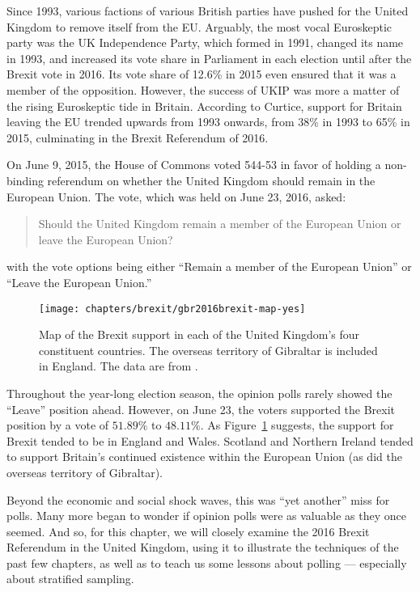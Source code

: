 Since 1993, various factions of various British parties have pushed for the United Kingdom to remove itself from the EU. Arguably, the most vocal Euroskeptic party was the UK Independence Party, which formed in 1991, changed its name in 1993, and increased its vote share in Parliament in each election until after the Brexit vote in 2016. Its vote share of 12.6\% in 2015 even ensured that it was a member of the opposition. However, the success of UKIP was more a matter of the rising Euroskeptic tide in Britain. According to Curtice, support for Britain leaving the EU trended upwards from 1993 onwards, from 38\% in 1993 to 65\% in 2015, culminating in the Brexit Referendum of 2016.\cite{tarran-2016} 


On June 9, 2015, the House of Commons voted 544-53 in favor of holding a non-binding referendum on whether the United Kingdom should remain in the European Union. The vote, which was held on June 23, 2016, asked:
\begin{quote}
Should the United Kingdom remain a member of the European Union or leave the European Union?
\end{quote}

\noindent
with the vote options being either ``Remain a member of the European Union'' or ``Leave the European Union.''


\begin{figure}\centering
\texttt{[image: chapters/brexit/gbr2016brexit-map-yes]}
\caption[Map of 2016 Brexit results by country]{Map of the Brexit support in each of the United Kingdom's four constituent countries. The overseas territory of Gibraltar is included in England. The data are from \cite{gbr2016countries}.}
\label{fig:brexit-gbr2016brexit}
\end{figure}

Throughout the year-long election season, the opinion polls rarely showed the ``Leave'' position ahead. However, on June 23, the voters supported the Brexit position by a vote of $51.89\%$ to $48.11\%$. As Figure~\ref{fig:brexit-gbr2016brexit} suggests, the support for Brexit tended to be in England and Wales. Scotland and Northern Ireland tended to support Britain's continued existence within the European Union (as did the overseas territory of Gibraltar).



Beyond the economic and social shock waves, this was ``yet another'' miss for polls. Many more began to wonder if opinion polls were as valuable as they once seemed. And so, for this chapter, we will closely examine the 2016 Brexit Referendum in the United Kingdom, using it to illustrate the techniques of the past few chapters, as well as to teach us some lessons about polling --- especially about stratified sampling.















